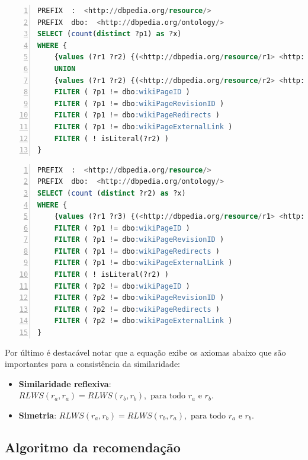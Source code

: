 \begin{lstlisting}[caption=Consulta SPARQL para contagem de links diretos (saíntes e entrantes) entre dois recursos., language=SQL, frame=single, label={cod:sparql_cdio}, float, numbers=left]
PREFIX  :  <http://dbpedia.org/resource/>
PREFIX  dbo:  <http://dbpedia.org/ontology/>
SELECT (count(distinct ?p1) as ?x)
WHERE {
	{values (?r1 ?r2) {(<http://dbpedia.org/resource/r1> <http://dbpedia.org/resource/France>)} ?r1 ?p1 ?r2 . FILTER (?r1 != ?r2) }
	UNION
	{values (?r1 ?r2) {(<http://dbpedia.org/resource/r2> <http://dbpedia.org/resource/Paris>)} ?r1 ?p1 ?r2 . FILTER (?r1 != ?r2) }
	FILTER ( ?p1 != dbo:wikiPageID )
	FILTER ( ?p1 != dbo:wikiPageRevisionID )
	FILTER ( ?p1 != dbo:wikiPageRedirects )
	FILTER ( ?p1 != dbo:wikiPageExternalLink )
	FILTER ( ! isLiteral(?r2) )
}
\end{lstlisting}

\begin{lstlisting}[caption=Consulta SPARQL para contagem de links indiretos (saíntes) entre dois recursos., language=SQL, frame=single, label={cod:sparql_cio}, float, numbers=left]
PREFIX  :  <http://dbpedia.org/resource/>
PREFIX  dbo:  <http://dbpedia.org/ontology/>
SELECT (count (distinct ?r2) as ?x)
WHERE {
	{values (?r1 ?r3) {(<http://dbpedia.org/resource/r1> <http://dbpedia.org/resource/r2>)} ?r2 ?p1 ?r1 . ?r2 ?p2 ?r3 . FILTER (?r1 != ?r3 && ?r2 != ?r1 && ?r2 != ?r3)}
	FILTER ( ?p1 != dbo:wikiPageID )
	FILTER ( ?p1 != dbo:wikiPageRevisionID )
	FILTER ( ?p1 != dbo:wikiPageRedirects )
	FILTER ( ?p1 != dbo:wikiPageExternalLink )
	FILTER ( ! isLiteral(?r2) )
	FILTER ( ?p2 != dbo:wikiPageID )
	FILTER ( ?p2 != dbo:wikiPageRevisionID )
	FILTER ( ?p2 != dbo:wikiPageRedirects )
	FILTER ( ?p2 != dbo:wikiPageExternalLink )
}
\end{lstlisting}

Por último é destacável notar que a equação exibe os axiomas abaixo que são importantes para a consistência da similaridade:

\begin{itemize}
	\item{\textbf{Similaridade reflexiva}: $RLWS(r_a, r_a) = RLWS(r_b, r_b), \text{ para todo } r_a \text{ e } r_b$.}
	\item{\textbf{Simetria}: $RLWS(r_a, r_b) = RLWS(r_b, r_a), \text{ para todo } r_a \text{ e } r_b$.}
\end{itemize}

\subsection{Algoritmo da recomendação}
\label{ssec:rec_alg}

